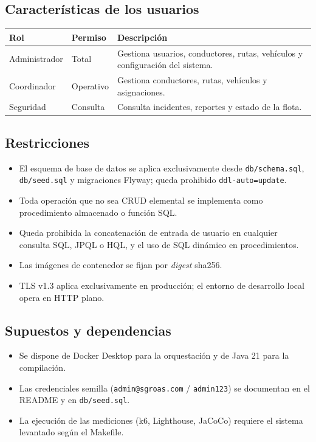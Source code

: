 \documentclass[12pt,a4paper]{article}
\begin{document}
\subsection{Características de los usuarios}
\label{sec:usuarios}

\begin{longtable}{@{}p{3cm}p{3.5cm}p{8cm}@{}}
\toprule
\textbf{Rol} & \textbf{Permiso} & \textbf{Descripción} \\
\midrule
\endhead
Administrador & Total & Gestiona usuarios, conductores, rutas, vehículos y configuración del sistema. \\
Coordinador & Operativo & Gestiona conductores, rutas, vehículos y asignaciones. \\
Seguridad & Consulta & Consulta incidentes, reportes y estado de la flota. \\
\bottomrule
\end{longtable}

\subsection{Restricciones}
\label{sec:restricciones}

\begin{itemize}
  \item El esquema de base de datos se aplica exclusivamente desde \texttt{db/schema.sql},
  \texttt{db/seed.sql} y migraciones Flyway; queda prohibido \texttt{ddl-auto=update}.
  \item Toda operación que no sea CRUD elemental se implementa como procedimiento almacenado
  o función SQL.
  \item Queda prohibida la concatenación de entrada de usuario en cualquier consulta SQL, JPQL
  o HQL, y el uso de SQL dinámico en procedimientos.
  \item Las imágenes de contenedor se fijan por \textit{digest} sha256.
  \item TLS v1.3 aplica exclusivamente en producción; el entorno de desarrollo local opera en HTTP plano.
\end{itemize}

\subsection{Supuestos y dependencias}
\label{sec:supuestos}

\begin{itemize}
  \item Se dispone de Docker Desktop para la orquestación y de Java 21 para la compilación.
  \item Las credenciales semilla (\texttt{admin@sgroas.com} / \texttt{admin123}) se documentan
  en el README y en \texttt{db/seed.sql}.
  \item La ejecución de las mediciones (k6, Lighthouse, JaCoCo) requiere el sistema levantado
  según el Makefile.
\end{itemize}
\end{document}
